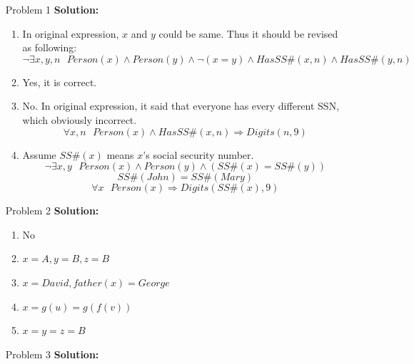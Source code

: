 \normalfont\documentclass[letterpaper,11pt]{article}
\begin{document}
\setlength{\parindent}{2ex}
\newcommand{\header}{
	\noindent {}
}
\bigskip
\header

\begin{enumerate}
\item[Problem 1]\textbf{Solution:}\par
	\begin{enumerate}
		\item \par
			In original expression, $x$ and $y$ could be same. Thus it should be revised as following:
			$$\neg \exists x,y,n\text{ }Person(x) \land Person(y) \land \neg(x = y) \land HasSS\#(x,n) \land HasSS\#(y,n)$$ 
		\item \par
			Yes, it is correct.
		\item \par
			No. In original expression, it said that everyone has every different SSN, which obviously incorrect.
			$$\forall x,n\text{ }Person(x) \land HasSS\#(x,n) \Rightarrow Digits(n,9)$$
		\item \par
		Assume $SS\#(x)$ means $x$'s social security number.
		$$\neg \exists x,y\text{ }Person(x) \land Person(y) \land (SS\#(x) = SS\#(y))$$
		$$SS\#(John) = SS\#(Mary)$$
		$$\forall x\text{ }Person(x) \Rightarrow Digits(SS\#(x),9)$$
	\end{enumerate}
\item[Problem 2]\textbf{Solution:}\par
	\begin{enumerate}
		\item No
		\item $x = A, y = B , z = B$
		\item $x = David, father(x) = George$
		\item $x = g(u) = g(f(v))$
		\item $x = y = z = B$
	\end{enumerate}
\item[Problem 3]\textbf{Solution:}\par

\end{enumerate}
\end{document}

